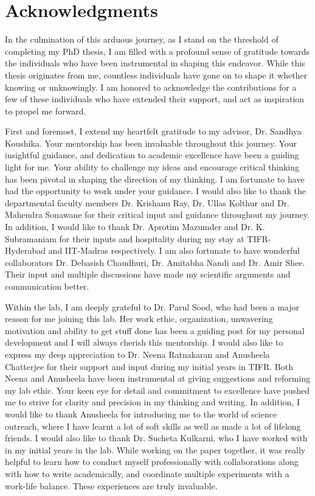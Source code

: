 \chapter[Acknowledgments]{\centering Acknowledgments}


In the culmination of this arduous journey, as I stand on the threshold of completing my PhD thesis, I am filled with a profound sense of gratitude towards the individuals who have been instrumental in shaping this endeavor. While this thesis originates from me, countless individuals have gone on to shape it whether knowing or unknowingly. I am honored to acknowledge the contributions for a few of these individuals who have extended their support, and act as inspiration to propel me forward.

First and foremost, I extend my heartfelt gratitude to my advisor, Dr. Sandhya Koushika. Your mentorship has been invaluable throughout this journey. Your insightful guidance, and dedication to academic excellence have been a guiding light for me. Your ability to challenge my ideas and encourage critical thinking has been pivotal in shaping the direction of my thinking. I am fortunate to have had the opportunity to work under your guidance. I would also like to thank the departmental faculty members Dr. Krishanu Ray, Dr. Ullas Kolthur and Dr. Mahendra Sonawane for their critical input and guidance throughout my journey. In addition, I would like to thank Dr. Aprotim Mazumder and Dr. K. Subramaniam for their inputs and hospitality during my stay at TIFR-Hyderabad and IIT-Madras respectively. I am also fortunate to have wonderful collaborators Dr. Debasish Chaudhuri, Dr. Amitabha Nandi and Dr. Amir Shee. Their input and multiple discussions have made my scientific arguments and communication better.

Within the lab, I am deeply grateful to Dr. Parul Sood, who had been a major reason for me joining this lab. Her work ethic, organization, unwavering motivation and ability to get stuff done has been a guiding post for my personal development and I will always cherish this mentorship. I would also like to express my deep appreciation to Dr. Neena Ratnakaran and Anusheela Chatterjee for their support and input during my initial years in TIFR. Both Neena and Anusheela have been instrumental at giving suggestions and reforming my lab ethic. Your keen eye for detail and commitment to excellence have pushed me to strive for clarity and precision in my thinking and writing. In addition, I would like to thank Anusheela for introducing me to the world of science outreach, where I have learnt a lot of soft skills as well as made a lot of lifelong friends. I would also like to thank Dr. Sucheta Kulkarni, who I have worked with in my initial years in the lab. While working on the paper together, it was really helpful to learn how to conduct myself professionally with collaborations along with how to write academically, and coordinate multiple experiments with a work-life balance. These experiences are truly invaluable.

